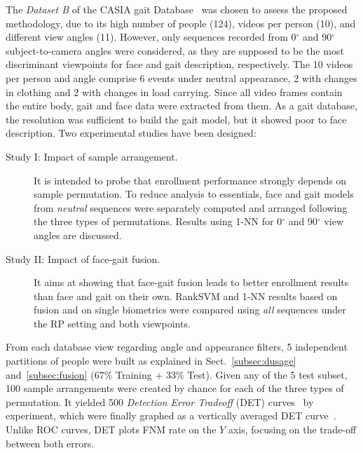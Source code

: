 \documentclass{llncs}
\begin{document}
\vspace{-1mm}
The \textit{Dataset B} of the CASIA gait Database~\cite{Yu:2006} was chosen to assess the proposed methodology, due to its high number of people (124), videos per person (10), and different view angles (11). However, only sequences recorded from 0$^{\circ}$ and 90$^{\circ}$ subject-to-camera angles were considered, as they are supposed to be the most discriminant viewpoints for face and gait description, respectively. The 10 videos per person and angle comprise 6 events under neutral appearance, 2 with changes in clothing and 2 with changes in load carrying. Since all video frames contain the entire body, gait and face data were extracted from them. As a gait database, the resolution was sufficient to build the gait model, but it showed poor to face description. Two experimental studies have been designed:
\begin{description}
\item[Study I: Impact of sample arrangement.] It is intended to probe that enrollment performance strongly depends on sample permutation. To reduce analysis to essentials, face and gait models from \emph{neutral} sequences were separately computed and arranged following the three types of permutations. Results using 1-NN for 0$^{\circ}$ and 90$^{\circ}$ view angles are discussed. 
\item[Study II: Impact of face-gait fusion.] It aims at showing that face-gait fusion leads to better enrollment results than face and gait on their own. %
RankSVM and 1-NN results based on fusion and on single biometrics were compared using \emph{all} sequences under the RP setting and both viewpoints. 
\end{description}

From each database view regarding angle and appearance filters, 5 independent partitions of people were built as explained in Sect.~\ref{subsec:dusage} and~\ref{subsec:fusion} ($67\%$ Training + $33\%$ Test). Given any of the 5 test subset, 100 sample arrangements were created by chance for each of the three types of permutation. It yielded %
500 \emph{Detection Error Tradeoff} (DET) curves~\cite{Martin:1997} by experiment, which were finally graphed as a vertically averaged DET curve~\cite{Fawcett2006}. Unlike ROC curves, DET plots FNM rate on the $Y$ axis, focusing on the trade-off between both errors.
\end{document}
